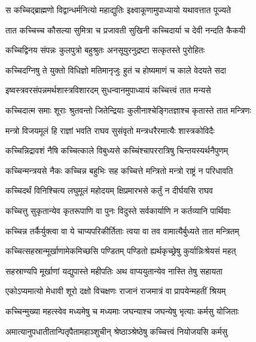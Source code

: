 \twolineshloka
{स कच्चिद्ब्राह्मणो विद्वान्धर्मनित्यो महाद्युतिः}
{इक्ष्वाकूणामुपाध्यायो यथावत्तात पूज्यते} %

\twolineshloka
{तात कच्चिच्च कौसल्या सुमित्रा च प्रजावती}
{सुखिनी कच्चिदार्या च देवी नन्दति कैकयी} %

\twolineshloka
{कच्चिद्विनय संपन्नः कुलपुत्रो बहुश्रुतः}
{अनसूयुरनुद्रष्टा सत्कृतस्ते पुरोहितः} %

\twolineshloka
{कच्चिदग्निषु ते युक्तो विधिज्ञो मतिमानृजुः}
{हुतं च होष्यमाणं च काले वेदयते सदा} %

\twolineshloka
{इष्वस्त्रवरसंपन्नमर्थशास्त्रविशारदम्}
{सुधन्वानमुपाध्यायं कच्चित्त्वं तात मन्यसे} %

\twolineshloka
{कच्चिदात्म समाः शूराः श्रुतवन्तो जितेन्द्रियाः}
{कुलीनाश्चेङ्गितज्ञाश्च कृतास्ते तात मन्त्रिणः} %

\twolineshloka
{मन्त्रो विजयमूलं हि राज्ञां भवति राघव}
{सुसंवृतो मन्त्रधरैरमात्यैः शास्त्रकोविदैः} %

\twolineshloka
{कच्चिन्निद्रावशं नैषि कच्चित्काले विबुध्यसे}
{कच्चिंश्चापररात्रिषु चिन्तयस्यर्थनैपुणम्} %

\twolineshloka
{कच्चिन्मन्त्रयसे नैकः कच्चिन्न बहुभिः सह}
{कच्चित्ते मन्त्रितो मन्त्रो राष्ट्रं न परिधावति} %

\twolineshloka
{कच्चिदर्थं विनिश्चित्य लघुमूलं महोदयम्}
{क्षिप्रमारभसे कर्तुं न दीर्घयसि राघव} %

\twolineshloka
{कच्चित्तु सुकृतान्येव कृतरूपाणि वा पुनः}
{विदुस्ते सर्वकार्याणि न कर्तव्यानि पार्थिवाः} %

\twolineshloka
{कच्चिन्न तर्कैर्युक्त्वा वा ये चाप्यपरिकीर्तिताः}
{त्वया वा तव वामात्यैर्बुध्यते तात मन्त्रितम्} %

\twolineshloka
{कच्चित्सहस्रान्मूर्खाणामेकमिच्छसि पण्डितम्}
{पण्डितो ह्यर्थकृच्छ्रेषु कुर्यान्निःश्रेयसं महत्} %

\twolineshloka
{सहस्राण्यपि मूर्खाणां यद्युपास्ते महीपतिः}
{अथ वाप्ययुतान्येव नास्ति तेषु सहायता} %

\twolineshloka
{एकोऽप्यमात्यो मेधावी शूरो दक्षो विचक्षणः}
{राजानं राजमात्रं वा प्रापयेन्महतीं श्रियम्} %

\twolineshloka
{कच्चिन्मुख्या महत्स्वेव मध्यमेषु च मध्यमाः}
{जघन्याश्च जघन्येषु भृत्याः कर्मसु योजिताः} %

\twolineshloka
{अमात्यानुपधातीतान्पितृपैतामहाञ्शुचीन्}
{श्रेष्ठाञ्श्रेष्ठेषु कच्चित्त्वं नियोजयसि कर्मसु} %


